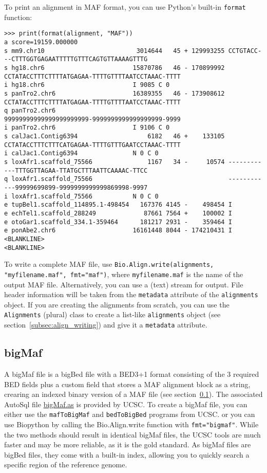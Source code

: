 To print an alignment in MAF format, you can use Python's built-in \verb|format| function:
\begin{verbatim}
>>> print(format(alignment, "MAF"))
a score=19159.000000
s mm9.chr10                         3014644   45 + 129993255 CCTGTACC---CTTTGGTGAGAATTTTTGTTTCAGTGTTAAAAGTTTG
s hg18.chr6                        15870786   46 - 170899992 CCTATACCTTTCTTTTATGAGAA-TTTTGTTTTAATCCTAAAC-TTTT
i hg18.chr6                        I 9085 C 0
s panTro2.chr6                     16389355   46 - 173908612 CCTATACCTTTCTTTTATGAGAA-TTTTGTTTTAATCCTAAAC-TTTT
q panTro2.chr6                                               99999999999999999999999-9999999999999999999-9999
i panTro2.chr6                     I 9106 C 0
s calJac1.Contig6394                   6182   46 +    133105 CCTATACCTTTCTTTCATGAGAA-TTTTGTTTGAATCCTAAAC-TTTT
i calJac1.Contig6394               N 0 C 0
s loxAfr1.scaffold_75566               1167   34 -     10574 ------------TTTGGTTAGAA-TTATGCTTTAATTCAAAAC-TTCC
q loxAfr1.scaffold_75566                                     ------------99999699899-9999999999999869998-9997
i loxAfr1.scaffold_75566           N 0 C 0
e tupBel1.scaffold_114895.1-498454   167376 4145 -    498454 I
e echTel1.scaffold_288249             87661 7564 +    100002 I
e otoGar1.scaffold_334.1-359464      181217 2931 -    359464 I
e ponAbe2.chr6                     16161448 8044 - 174210431 I
<BLANKLINE>
<BLANKLINE>
\end{verbatim}
To write a complete MAF file, use \verb|Bio.Align.write(alignments, "myfilename.maf", fmt="maf")|, where \verb|myfilename.maf| is the name of the output MAF file. Alternatively, you can use a (text) stream for output. File header information will be taken from the \verb|metadata| attribute of the \verb|alignments| object. If you are creating the alignments from scratch, you can use the \verb|Alignments| (plural) class to create a list-like \verb|alignments| object (see section~\ref{subsec:align_writing}) and give it a \verb|metadata| attribute.

\subsection{bigMaf}
\label{subsec:align_bigmaf}

A bigMaf file is a bigBed file with a BED3+1 format consisting of the 3 required BED fields plus a custom field that stores a MAF alignment block as a string, crearing an indexed binary version of a MAF file (see section~\ref{subsec:align_bigmaf}). The associated AutoSql file \href{https://genome.ucsc.edu/goldenPath/help/examples/bigMaf.as}{bigMaf.as} is provided by UCSC.
To create a bigMaf file, you can either use the \verb|mafToBigMaf| and \verb|bedToBigBed| programs from UCSC. or you can use Biopython by calling the Bio.Align.write function with \verb|fmt="bigmaf"|. While the two methods should result in identical bigMaf files, the UCSC tools are much faster and may be more reliable, as it is the gold standard. As bigMaf files are bigBed files, they come with a built-in index, allowing you to quickly search a specific region of the reference genome.

